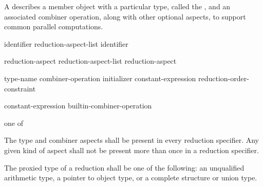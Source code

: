 
\pnum
A
describes a member object with a particular type,
called the
,
and an associated combiner operation,
along with other optional aspects,
to support common parallel computations.


\begin{bnf}
\br
{} identifier\opt{} \terminal{\{} reduction-aspect-list \terminal{\}}
\br
{} identifier
\end{bnf}

\begin{bnf}
\br
reduction-aspect
\br
reduction-aspect-list \terminal{,} reduction-aspect
\end{bnf}

\begin{bnf}
\br
{} \terminal{:} type-name
\br
{} \terminal{:} combiner-operation
\br
{} \terminal{:} initializer
\br
{} \terminal{:} constant-expression
\br
{} \terminal{:} reduction-order-constraint
\end{bnf}

\begin{bnf}
\br
constant-expression
\br
builtin-combiner-operation
\end{bnf}

\begin{bnf}
\textnormal{one of}
\br
\terminal{*=} \terminal{+=}
\br
\terminal{\&=} \terminal{\textasciicircum=} \terminal{|=}
\br
{} 
\br
{} 
\br
{}
\end{bnf}

\begin{bnf}
\br
{}
\br
{}
\end{bnf}


\pnum
The type and combiner aspects shall be present in every reduction specifier.
Any given kind of aspect shall not be present more than once
in a reduction specifier. 

\pnum
The proxied type of a reduction shall be
one of the following:
an unqualified arithmetic type,
a pointer to object type,
or a complete structure or union type.

